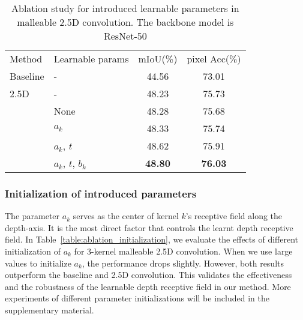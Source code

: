 \documentclass[runningheads]{llncs}
\begin{document}
\begin{table}[htbp]
  \begin{center}
  \caption{
  Ablation study for introduced learnable parameters in malleable 2.5D convolution.
  The backbone model is ResNet-50
  }
  \label{table:ablation_learnable_params}
  \setlength{\tabcolsep}{10pt}
  \begin{tabular}{llcc}
    \hline\noalign{\smallskip}
    Method & Learnable params & mIoU(\%) & pixel Acc(\%)\\
    \noalign{\smallskip}
    \hline
    \noalign{\smallskip}
    Baseline      & - & 44.56  & 73.01 \\
    2.5D\cite{2_5D}          & - & 48.23 & 75.73 \\
    \noalign{\smallskip}
    \hline
    \noalign{\smallskip}
    \multirow{4}{*}{Malleable 2.5D} & None              & 48.28 & 75.68 \\
     & $a_k$             & 48.33 & 75.74 \\
     & $a_k$, $t$        & 48.62 & 75.91 \\
     & $a_k$, $t$, $b_k$ & \textbf{48.80} & \textbf{76.03} \\
    \hline
  \end{tabular}
  \end{center}
\end{table}

\subsubsection{Initialization of introduced parameters}
The parameter $a_k$ serves as the center of kernel $k$'s receptive field along the depth-axis.
It is the most direct factor that controls the learnt depth receptive field.
In Table~\ref{table:ablation_initialization}, we evaluate the effects of different initialization of $a_k$ for 3-kernel malleable 2.5D convolution.
When we use large values to initialize $a_k$, the performance drops slightly.
However, both results outperform the baseline and 2.5D convolution.
This validates the effectiveness and the robustness of the learnable depth receptive field in our method.
More experiments of different parameter initializations will be included in the supplementary material.
\end{document}
